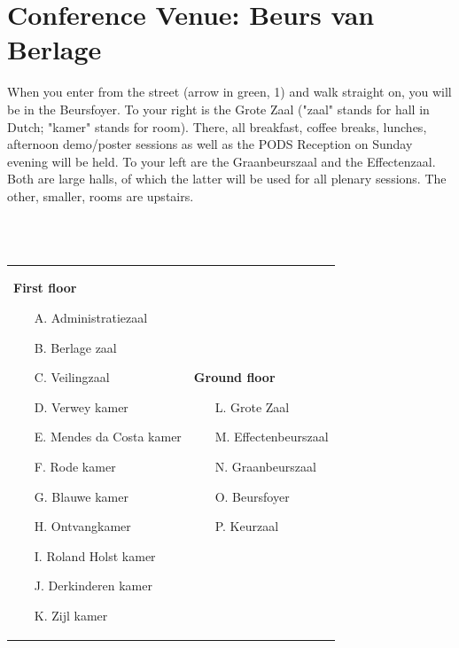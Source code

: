 \newpage
\section*{Conference Venue: Beurs van Berlage}

When you enter from the street (arrow in green, 1) and walk straight on, you will be in the Beursfoyer. To your right is the Grote Zaal ("zaal" stands for hall in Dutch; "kamer" stands for room). There, all breakfast, coffee breaks, lunches, afternoon demo/poster sessions as well as the PODS Reception on Sunday evening will be held. To your left are the Graanbeurszaal and the Effectenzaal. Both are large halls, of which the latter will be used for all plenary sessions. The other, smaller, rooms are upstairs.

~\\~

\begin{tabular}{p{}p{}}
\textbf{First floor}
\small
\begin{itemize}[noitemsep,topsep=0pt,parsep=0pt,partopsep=0pt]
\item[A.] Administratiezaal
\item[B.] Berlage zaal
\item[C.] Veilingzaal
\item[D.] Verwey kamer
\item[E.] Mendes da Costa kamer
\item[F.] Rode kamer
\item[G.] Blauwe kamer
\item[H.] Ontvangkamer
\item[I.] Roland Holst kamer
\item[J.] Derkinderen kamer
\item[K.] Zijl kamer
\end{itemize}
 & 
\textbf{Ground floor}
\small
\begin{itemize}[noitemsep,topsep=0pt,parsep=0pt,partopsep=0pt]
\item[L.] Grote Zaal
\item[M.] Effectenbeurszaal
\item[N.] Graanbeurszaal
\item[O.] Beursfoyer
\item[P.] Keurzaal
\end{itemize}
\end{tabular}

\newpage
~\\~~\\~~\\~

